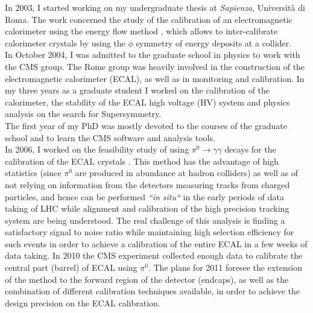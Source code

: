 \documentclass[10pt, a4paper]{article}
\begin{document}
In 2003, I started working on my undergraduate thesis at \textit{Sapienza}, Universit\`a di Roma. The work concerned the 
study of the calibration of an electromagnetic calorimeter using the energy flow method \cite{Santanastasio:LAUREA}, which allows to inter-calibrate 
calorimeter crystals by using the $\phi$ symmetry of energy deposits at a collider. \\

In October 2004, I was admitted to the graduate school in physics to work with the CMS group. 
The Rome group was heavily involved in the construction of the electromagnetic calorimeter (ECAL), 
as well as in monitoring and calibration. In my three years as a graduate student I worked on the calibration of 
the calorimeter, the stability of the ECAL high voltage (HV) system and physics analysis on the search for Supersymmetry. \\

The first year of my PhD was mostly devoted to the courses of the graduate school 
and to learn the CMS software and analysis tools. \\

In 2006, I worked on the feasibility study of using $\pi^0 \rightarrow \gamma\gamma$ decays for the calibration 
of the ECAL crystals \cite{Adzic:2008zza,DN-2007-013,IN-2006-050}. This method has the advantage of high 
statistics (since $\pi^0$ are produced in abundance at hadron colliders) as well as of not relying on information from 
the detectors measuring tracks from charged particles, and hence can be performed {\it ``in situ``} in the early 
periods of data taking of LHC while alignment and calibration of the high precision tracking system are being understood.
The real challenge of this analysis is finding a satisfactory signal to noise ratio while maintaining high selection efficiency for such events 
in order to achieve a calibration of the entire ECAL in a few weeks of data taking.
In 2010 the CMS experiment collected enough data to calibrate the central part (barrel) of ECAL using $\pi^0$.
The plans for 2011 foresee the extension of the method to the forward region of the detector (endcaps), 
as well as the combination of different calibration techniques available, in order to achieve the design precision 
on the ECAL calibration. \\
\end{document}
